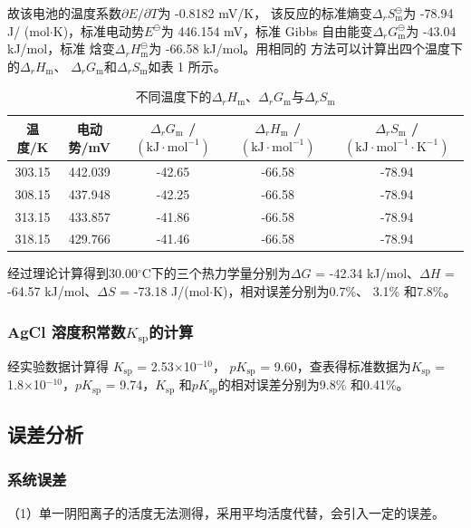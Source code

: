 \documentclass[12pt]{ctexart}
\numberwithin{equation}{section}
\begin{document}
故该电池的温度系数$\partial E/\partial T$为 -0.8182 mV/K，
该反应的标准熵变$\Delta_r S^{\ominus}_{\text{m}}$为 -78.94 J/
(mol$\cdot$K)，标准电动势$E^{\ominus}$为 446.154 mV，标准 Gibbs
自由能变$\Delta_r G^{\ominus}_{\text{m}}$为 -43.04 kJ/mol，标准
焓变$\Delta_r H^{\ominus}_{\text{m}}$为 -66.58 kJ/mol。用相同的
方法可以计算出四个温度下的$\Delta_r H_{\text{m}}$、
$\Delta_r G_{\text{m}}$和$\Delta_r S_{\text{m}}$如表 1 所示。

\begin{longtable}{ccccc}
    \caption{不同温度下的$\Delta_r H_\text{m}$、$\Delta_r G_\text{m}$与$\Delta_r S_\text{m}$} \\
    \hline
    温度/K & 电动势/mV & $\Delta_r G_\text{m}$ / $\mathrm{(kJ\cdot mol^{-1})}$ & $\Delta_r H_\text{m}$ / $\mathrm{(kJ\cdot mol^{-1})}$ & $\Delta_r S_\text{m}$ / $\mathrm{(kJ\cdot mol^{-1}\cdot K^{-1})}$ \\
    \hline
    303.15 & 442.039 & -42.65 & -66.58 & -78.94 \\
    308.15 & 437.948 & -42.25 & -66.58 & -78.94 \\
    313.15 & 433.857 & -41.86 & -66.58 & -78.94 \\
    318.15 & 429.766 & -41.46 & -66.58 & -78.94 \\
    \hline
\end{longtable}

\newpage
经过理论计算得到30.00$^\circ$C下的三个热力学量分别为$\Delta G$ =
-42.34 kJ/mol、$\Delta H$ = -64.57 kJ/mol、$\Delta S$ =
-73.18 J/(mol$\cdot$K)，相对误差分别为0.7\%、
3.1\% 和7.8\%。

\subsubsection{\texorpdfstring{AgCl 溶度积常数$K_{\text{sp}}$的计算}{}}

经实验数据计算得 $K_{\text{sp}}$ = 2.53$\times$10$^{-10}$，
$pK_{\text{sp}}$ = 9.60，查表得标准数据为$K_{\text{sp}}$ =
1.8$\times$10$^{-10}$，$pK_{\text{sp}}$ = 9.74，$K_{\text{sp}}$
和$pK_{\text{sp}}$的相对误差分别为9.8\%
和0.41\%。

\subsection{误差分析}
\subsubsection{系统误差}
（1）单一阴阳离子的活度无法测得，采用平均活度代替，会引入一定的误差。
\end{document}
